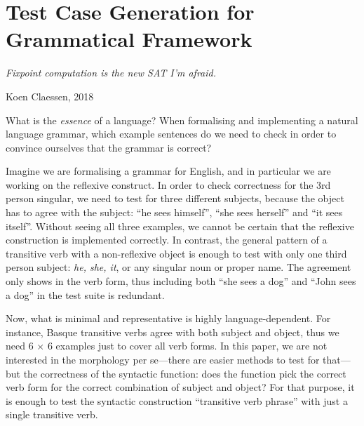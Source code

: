 \def\t#1{\texttt{#1}}
\def\gf{\textsc{gf}}
\def\pgf{\textsc{pgf}}
\def\lfg{\textsc{lfg}}
\def\ccg{\textsc{ccg}}
\def\tag{\textsc{tag}}
\def\cfg{\textsc{cfg}}
\def\pmcfg{\textsc{pmcfg}}
\def\hpsg{\textsc{hpsg}}
\def\feat{\textsc{feat}}
\def\numOfLex{17}
\def\numOfFun{8}
\newcommand{\tts}[1]{{\tt #1}}

\chapter{Test Case Generation for Grammatical Framework}
\label{chapterGFtest}

\epigraph{\it Fixpoint computation is the new SAT I'm afraid.}{Koen
  Claessen, 2018}

\noindent What is the \emph{essence} of a language? When formalising
and implementing a natural language grammar, which example sentences
do we need to check in order to convince ourselves that the grammar is
correct? 

Imagine we are formalising a grammar for English, and in particular we
are working on the reflexive construct. In order to check correctness
for the 3rd person singular, we need to test for three different
subjects, because the object has to agree with the subject: ``he sees
himself'', ``she sees herself'' and ``it sees itself''. Without seeing
all three examples, we cannot be certain that the reflexive
construction is implemented correctly. In contrast, the general
pattern of a transitive verb with a non-reflexive object is enough to
test with only one third person subject: \emph{he, she, it}, or any
singular noun or proper name. The agreement only shows in the verb
form, thus including both ``she sees a dog'' and ``John sees a dog''
in the test suite is redundant.  

Now, what is minimal and representative is highly language-dependent. 
For instance, Basque transitive verbs agree with both subject and
object, thus we need 6 $\times$ 6 examples just to cover all verb
forms. In this paper, we are not interested in the morphology per se---there are
easier methods to test for that---but the correctness of the syntactic
function: does the function pick the correct verb form for the correct
combination of subject and object? For that purpose, it is enough to
test the syntactic construction ``transitive verb phrase'' with just a
single transitive verb.

